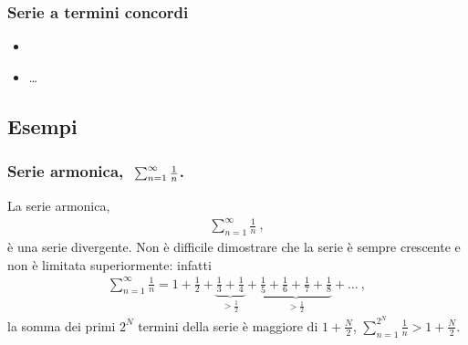 \documentclass[letterpaper,10pt,english]{jupyterBook}
\begin{document}
\subsubsection{Serie a termini concordi}
\label{\detokenize{ch/series:id1}}\begin{itemize}
\item {} 
\sphinxAtStartPar
{}

\item {} 
\sphinxAtStartPar
…

\end{itemize}


\subsection{Esempi}
\label{\detokenize{ch/series:esempi}}\subsubsection*{Serie armonica, \protect\(\ \sum_{n=1}^{\infty} \frac{1}{n}\protect\).}

\sphinxAtStartPar
La serie armonica,
\begin{equation*}
\begin{split}\sum_{n=1}^{\infty} \frac{1}{n} \ ,\end{split}
\end{equation*}
\sphinxAtStartPar
è una serie divergente. Non è difficile dimostrare che la serie è sempre crescente e non è limitata superiormente: infatti
\begin{equation*}
\begin{split}\sum_{n=1}^{\infty} \frac{1}{n} = 1 + \frac{1}{2} + \underbrace{\frac{1}{3} + \frac{1}{4}}_{> \frac{1}{2}} + \underbrace{\frac{1}{5} + \frac{1}{6} + \frac{1}{7} + \frac{1}{8}}_{> \frac{1}{2}} + \dots \ ,\end{split}
\end{equation*}
\sphinxAtStartPar
la somma dei primi \(2^N\) termini della serie è maggiore di \(1 + \frac{N}{2}\), \(\sum_{n=1}^{2^N} \frac{1}{n} > 1 + \frac{N}{2}\).
\end{document}
